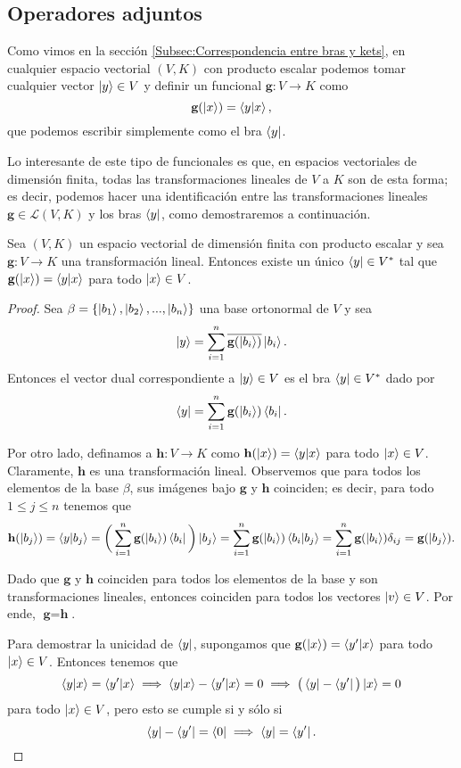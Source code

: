 \documentclass[12pt,dvipsnames]{article}
\newenvironment{teorema}[2][Teorema]{\begin{trivlist}
\item[\hskip \labelsep {\bfseries #1}\hskip \labelsep {\bfseries #2.}]}{\end{trivlist}}
\begin{document}
\subsection{Operadores adjuntos}

Como vimos en la sección \ref{Subsec:Correspondencia entre bras y kets}, en cualquier espacio vectorial $(V,K)$ con producto escalar podemos tomar cualquier vector $\ket{y}\in V$ y definir un funcional $\textbf{g}:V\to K$ como \[
    \textbf{g}(\ket{x})=\braket{y|x}
,\] que podemos escribir simplemente como el bra $\bra{y}$.

Lo interesante de este tipo de funcionales es que, en espacios vectoriales de dimensión finita, todas las transformaciones lineales de $V$ a $K$ son de esta forma; es decir, podemos hacer una identificación entre las transformaciones lineales $\textbf{g}\in\mathcal{L}(V,K)$ y los bras $\bra{y}$, como demostraremos a continuación.

\begin{teorema} {14.1}
    Sea $(V,K)$ un espacio vectorial de dimensión finita con producto escalar y sea $\textbf{g}:V\to K$ una transformación lineal. Entonces existe un único $\bra{y}\in V^*$ tal que $\textbf{g}(\ket{x})=\braket{y|x}$ para todo $\ket{x}\in V$.

    \begin{proof}
        Sea $\beta=\{\ket{b_1},\ket{b_2},...,\ket{b_n}\}$ una base ortonormal de $V$ y sea \[
            \ket{y}=\sum_{i=1}^n \overline{\textbf{g}(\ket{b_i})}\ket{b_i} 
            .\] Entonces el vector dual correspondiente a $\ket{y}\in V$ es el bra $\bra{y}\in V^*$ dado por \[
            \bra{y}=\sum_{i=1}^n\textbf{g}(\ket{b_i})\bra{b_i}
        .\]  

        Por otro lado, definamos a $\textbf{h}:V\to K$ como $\textbf{h} (\ket{x})=\braket{y|x}$ para todo $\ket{x}\in V$. Claramente, $\textbf{h}$ es una transformación lineal. Observemos que para todos los elementos de la base $\beta$, sus imágenes bajo $\textbf{g}$ y $\textbf{h}$ coinciden; es decir, para todo $1\leq j\leq n$ tenemos que \[
            \textbf{h}(\ket{b_j})=\braket{y|b_j}=\bigg(\sum_{i=1}^n \textbf{g}(\ket{b_i})\bra{b_i}\bigg)\ket{b_j}=\sum_{i=1}^n \textbf{g}(\ket{b_i}) \braket{b_i|b_j}=\sum_{i=1}^n \textbf{g}(\ket{b_i})\delta_{ij}=\textbf{g}(\ket{b_j})
        .\] 

        Dado que $\textbf{g}$ y $\textbf{h}$ coinciden para todos los elementos de la base y son transformaciones lineales, entonces coinciden para todos los vectores $\ket{v}\in V$. Por ende, $\textbf{g}=\textbf{h}$. 

        Para demostrar la unicidad de $\bra{y}$, supongamos que $\textbf{g}(\ket{x})=\braket{y'|x}$ para todo $\ket{x}\in V$. Entonces tenemos que $$\braket{y|x}=\braket{y'|x} \implies \braket{y|x}-\braket{y'|x}=0 \implies \big(\bra{y}-\bra{y'}\big)\ket{x}=0$$ para todo $\ket{x}\in V$, pero esto se cumple si y sólo si $$\bra{y}-\bra{y'}=\bra{0}\implies \bra{y}=\bra{y'}.$$

    \end{proof}

\end{teorema}
\end{document}
